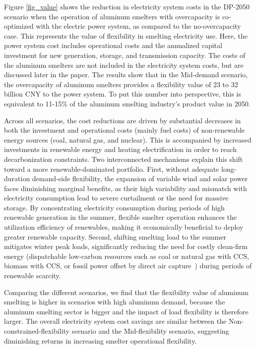 \documentclass[preprint]{elsarticle}
\begin{document}
Figure \ref{fig_value} shows the reduction in electricity system costs in the DP-2050 scenario when the operation of aluminum smelters with overcapacity is co-optimized with the electric power system, as compared to the no-overcapacity case. This represents the value of flexibility in smelting electricity use. Here, the power system cost includes operational costs and the annualized capital investment for new generation, storage, and transmission capacity. The costs of the aluminum smelters are not included in the electricity system costs, but are discussed later in the paper. The results show that in the Mid-demand scenario, the overcapacity of aluminum smelters provides a flexibility value of 23 to 32 billion CNY to the power system. To put this number into perspective, this is equivalent to 11-15\% of the aluminum smelting industry's product value in 2050.

Across all scenarios, the cost reductions are driven by substantial decreases in both the investment and operational costs (mainly fuel costs) of non-renewable energy sources (coal, natural gas, and nuclear). This is accompanied by increased investments in renewable energy and heating electrification in order to reach decarbonization constraints. Two interconnected mechanisms explain this shift toward a more renewable-dominated portfolio. First, without adequate long-duration demand-side flexibility, the expansion of variable wind and solar power faces diminishing marginal benefits, as their high variability and mismatch with electricity consumption lead to severe curtailment or the need for massive storage. By concentrating electricity consumption during periods of high renewable generation in the summer, flexible smelter operation enhances the utilization efficiency of renewables, making it economically beneficial to deploy greater renewable capacity. Second, shifting smelting load to the summer mitigates winter peak loads, significantly reducing the need for costly clean-firm energy (dispatchable low-carbon resources such as coal or natural gas with CCS, biomass with CCS, or fossil power offset by direct air capture~\citep{sepulveda_role_2018}) during periods of renewable scarcity.

Comparing the different scenarios, we find that the flexibility value of aluminum smelting is higher in scenarios with high aluminum demand, because the aluminum smelting sector is bigger and the impact of load flexibility is therefore larger. The overall electricity system cost savings are similar between the Non-constrained-flexibility scenario and the Mid-flexibility scenario, suggesting diminishing returns in increasing smelter operational flexibility.
\end{document}
